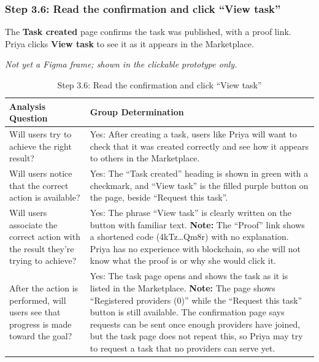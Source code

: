 \documentclass{article}
\begin{document}
\subsubsection{Step 3.6: Read the confirmation and click ``View task''}
The \textbf{Task created} page confirms the task was published, with a proof link. Priya clicks \textbf{View task} to see it as it appears in the Marketplace.

\textit{Not yet a Figma frame; shown in the clickable prototype only.}

\begin{table}[H]
    \centering
    \begin{tabularx}{\textwidth}{|p{5.5cm}|X|}
        \hline
        \textbf{Analysis Question} & \textbf{Group Determination} \\
        \hline
        Will users try to achieve the right result? & Yes: After creating a task, users like Priya will want to check that it was created correctly and see how it appears to others in the Marketplace. \\
        \hline
        Will users notice that the correct action is available? & Yes: The ``Task created'' heading is shown in green with a checkmark, and ``View task'' is the filled purple button on the page, beside ``Request this task''. \\
        \hline
        Will users associate the correct action with the result they're trying to achieve? & Yes: The phrase ``View task'' is clearly written on the button with familiar text. \newline \textbf{Note:} The ``Proof'' link shows a shortened code (4kTz\ldots Qm8r) with no explanation. Priya has no experience with blockchain, so she will not know what the proof is or why she would click it. \\
        \hline
        After the action is performed, will users see that progress is made toward the goal? & Yes: The task page opens and shows the task as it is listed in the Marketplace. \newline \textbf{Note:} The page shows ``Registered providers (0)'' while the ``Request this task'' button is still available. The confirmation page says requests can be sent once enough providers have joined, but the task page does not repeat this, so Priya may try to request a task that no providers can serve yet. \\
        \hline
    \end{tabularx}
    \caption{Step 3.6: Read the confirmation and click ``View task''}
    \label{tab:cw-step-3-6}
\end{table}
\end{document}
